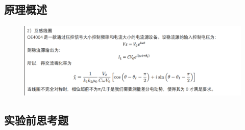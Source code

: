 \documentclass{ctexart}                                     %
\theoremstyle{ansstyle}
\begin{document}
\subsection{原理概述}
\begin{figure}[H]
    \centering
    \includegraphics[width=1.0\linewidth]{./png/z2.png}
\end{figure}
\subsection{实验前思考题}
\end{document}
